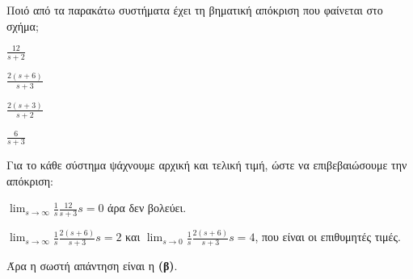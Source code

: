\documentclass[11pt,a4paper,notitlepage,fleqn,final]{article}
\begin{document}
\begin{exercise}
Ποιό από τα παρακάτω συστήματα έχει τη βηματική απόκριση που φαίνεται στο σχήμα;


\begin{enumlatin}
	\item \( \displaystyle \frac{12}{s+2} \)
	\item \( \displaystyle \frac{2(s+6)}{s+3} \)
	\item \( \displaystyle \frac{2(s+3)}{s+2} \)
	\item \( \displaystyle \frac{6}{s+3} \)
\end{enumlatin}

\tcblower

Για το κάθε σύστημα ψάχνουμε αρχική και τελική τιμή, ώστε να επιβεβαιώσουμε την απόκριση:
\begin{enumlatin}
	\item \( \displaystyle \lim_{s\to \infty}
	\frac{1}{s} \frac{12}{s+3} s = 0
	 \) άρα δεν βολεύει.
	\item \( \displaystyle \lim_{s\to \infty} \frac{1}{s}\frac{2(s+6)}{s+3}s=2 \)
	και \( \displaystyle \lim_{s\to 0} \frac{1}{s}\frac{2(s+6)}{s+3}s=4  \), που είναι οι
	επιθυμητές τιμές.
\end{enumlatin}

Άρα η σωστή απάντηση είναι η \textbf{(β)}.

\end{exercise}
\end{document}
